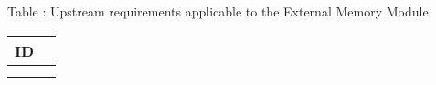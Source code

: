 {
  \vspace{0.5em}
  \begin{center}
    Table \thetable: Upstream requirements applicable to the External Memory Module\label{tab:regm-upstream-requirements}
  \end{center}
  
\footnotesize
\begin{xltabular}{0.9\textwidth}{|X|c|}
  \hline
  \textbf{ID} \\
  \hline
   \\
  \hline
   \\
  \hline
\end{xltabular}
}
